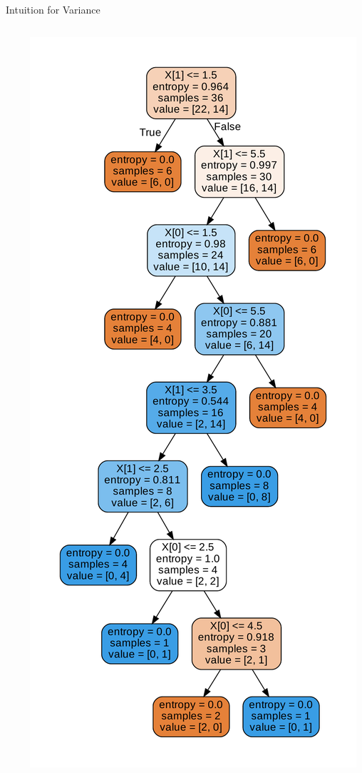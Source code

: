 \documentclass[aspectratio=169,10pt]{beamer}
\newcommand{\fitpic}[1]{\begin{adjustbox}{max width=\linewidth, max totalheight=0.78\textheight}#1\end{adjustbox}}
\begin{document}
\begin{frame}{Intuition for Variance}
\begin{columns}
\begin{column}{0.5\textwidth}
\begin{center}
			\end{center}
		\end{column}
		\begin{column}{0.5\textwidth}
			\begin{center}
			\fitpic{\includegraphics[scale=0.2]{var_2}}
			\end{center}
		\end{column}
	\end{columns}
	\end{frame}
\end{document}
